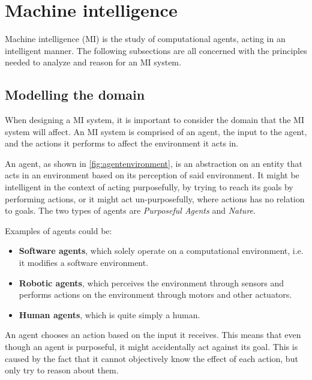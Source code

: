 \section{Machine intelligence}\label{theory:machineintelligence}
Machine intelligence (MI) is the study of computational agents, acting in an intelligent manner.
The following subsections are all concerned with the principles needed to analyze and reason for an MI system.

\subsection{Modelling the domain}\label{Theory:MIModelling}
When designing a MI system, it is important to consider the domain that the MI system will affect.
An MI system is comprised of an agent, the input to the agent, and the actions it performs to affect the environment it acts in.



An agent, as shown in \autoref{fig:agentenvironment}, is an abstraction on an entity that acts in an environment based on its perception of said environment\cite{ArtificialIntelligencealanpoole}.
It might be intelligent in the context of acting purposefully, by trying to reach its goals by performing actions, or it might act un-purposefully, where actions has no relation to goals.
The two types of agents are \textit{Purposeful Agents} and \textit{Nature}.

Examples of agents could be:
\begin{itemize}
	\item \textbf{Software agents}, which solely operate on a computational environment, i{.}e{.} it modifies a software environment.
	\item \textbf{Robotic agents}, which perceives the environment through sensors and performs actions on the environment through motors and other actuators.
	\item \textbf{Human agents}, which is quite simply a human. 
\end{itemize}

An agent chooses an action based on the input it receives.
This means that even though an agent is purposeful, it might accidentally act against its goal.
This is caused by the fact that it cannot objectively know the effect of each action, but only try to reason about them.

